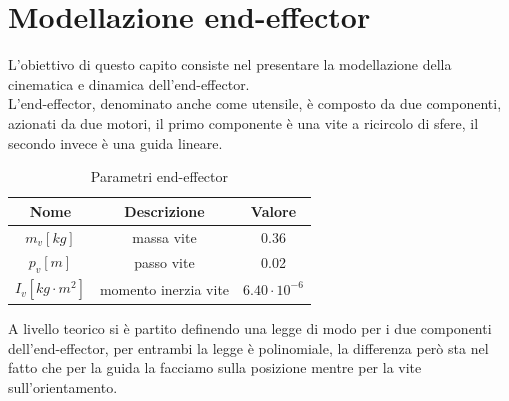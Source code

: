 \section{Modellazione end-effector}
L'obiettivo di questo capito consiste nel presentare la modellazione della cinematica e dinamica dell'end-effector.
\\L'end-effector, denominato anche come utensile, è composto da due componenti, azionati da due motori, il primo componente è una vite a ricircolo di sfere, il secondo invece è una guida lineare. 
\begin{table}[h!]
\centering
\begin{tabular}{|c |c |c|} 
 \hline
 Nome & Descrizione  & Valore \\ [0.5ex] 
 \hline\hline
 $m_v [kg]$ & massa vite  & 0.36 \\ 
 $p_v [m]$ & passo vite & 0.02 \\
 $I_v [kg\cdot m^2]$ & momento inerzia vite  & $6.40\cdot 10^{-6}$ \\
 \hline
\end{tabular}
\caption{Parametri end-effector}
\label{table:2}
\end{table}
A livello teorico si è partito definendo una legge di modo per i due componenti dell'end-effector, per entrambi la legge è polinomiale, la differenza però sta nel fatto che per la guida la facciamo sulla posizione mentre per la vite sull'orientamento.
